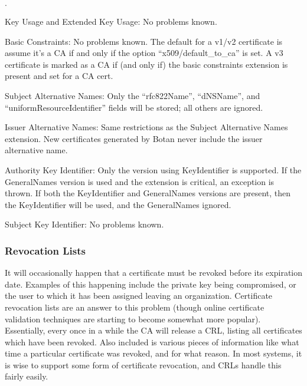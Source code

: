 \documentclass{article}
\begin{document}
\begin{list}{$\cdot$}
  \item Key Usage and Extended Key Usage: No problems known.
  \item

  \item Basic Constraints: No problems known. The default for a v1/v2
        certificate is assume it's a CA if and only if the option
        ``x509/default\_to\_ca'' is set. A v3 certificate is marked as a CA if
        (and only if) the basic constraints extension is present and set for a
        CA cert.

  \item Subject Alternative Names: Only the ``rfc822Name'', ``dNSName'', and
        ``uniformResourceIdentifier'' fields will be stored; all others are
        ignored.

  \item Issuer Alternative Names: Same restrictions as the Subject Alternative
        Names extension. New certificates generated by Botan never include the
        issuer alternative name.

  \item Authority Key Identifier: Only the version using KeyIdentifier is
        supported. If the GeneralNames version is used and the extension is
        critical, an exception is thrown. If both the KeyIdentifier and
        GeneralNames versions are present, then the KeyIdentifier will be
        used, and the GeneralNames ignored.

  \item Subject Key Identifier: No problems known.
\end{list}

\subsubsection{Revocation Lists}

It will occasionally happen that a certificate must be revoked before its
expiration date. Examples of this happening include the private key being
compromised, or the user to which it has been assigned leaving an
organization. Certificate revocation lists are an answer to this problem
(though online certificate validation techniques are starting to become
somewhat more popular). Essentially, every once in a while the CA will release
a CRL, listing all certificates which have been revoked. Also included is
various pieces of information like what time a particular certificate was
revoked, and for what reason. In most systems, it is wise to support some form
of certificate revocation, and CRLs handle this fairly easily.
\end{document}
